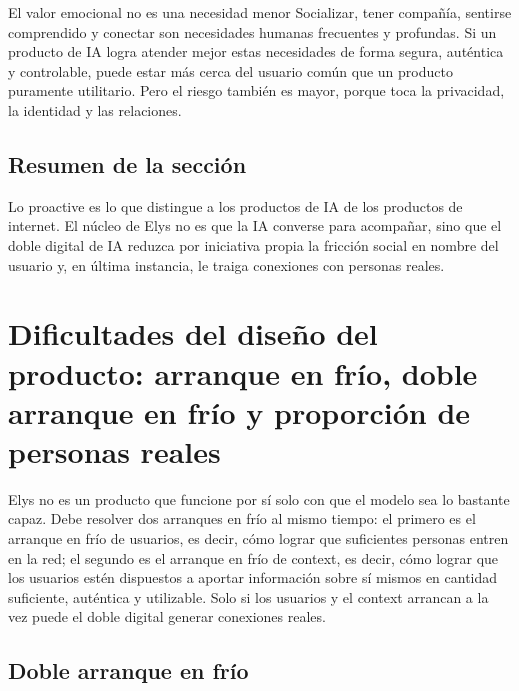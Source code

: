 \documentclass[a4paper]{article}
\begin{document}
\begin{warningbox}{El valor emocional no es una necesidad menor}
Socializar, tener compañía, sentirse comprendido y conectar son necesidades humanas frecuentes y profundas. Si un producto de IA logra atender mejor estas necesidades de forma segura, auténtica y controlable, puede estar más cerca del usuario común que un producto puramente utilitario. Pero el riesgo también es mayor, porque toca la privacidad, la identidad y las relaciones.\end{warningbox}

\subsection{Resumen de la sección}

Lo proactive es lo que distingue a los productos de IA de los productos de internet. El núcleo de Elys no es que la IA converse para acompañar, sino que el doble digital de IA reduzca por iniciativa propia la fricción social en nombre del usuario y, en última instancia, le traiga conexiones con personas reales.

\section{Dificultades del diseño del producto: arranque en frío, doble arranque en frío y proporción de personas reales}

Elys no es un producto que funcione por sí solo con que el modelo sea lo bastante capaz. Debe resolver dos arranques en frío al mismo tiempo: el primero es el arranque en frío de usuarios, es decir, cómo lograr que suficientes personas entren en la red; el segundo es el arranque en frío de context, es decir, cómo lograr que los usuarios estén dispuestos a aportar información sobre sí mismos en cantidad suficiente, auténtica y utilizable. Solo si los usuarios y el context arrancan a la vez puede el doble digital generar conexiones reales.

\subsection{Doble arranque en frío}
\end{document}
